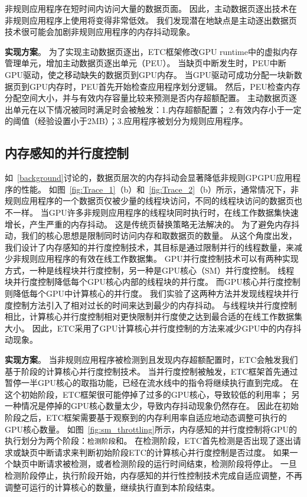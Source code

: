 非规则应用程序在短时间内访问大量的数据页面。
因此，主动数据页逐出技术在非规则应用程序上使用将变得非常低效。
我们发现潜在地缺点是主动逐出数据页技术很可能会加剧非规则应用程序的内存抖动现象。

\textbf{实现方案}。
为了实现主动数据页逐出，ETC框架修改GPU runtime中的虚拟内存管理单元，增加主动数据页逐出单元（PEU）。
当缺页中断发生时，PEU中断GPU驱动，使之移动缺失的数据页到GPU内存。
当GPU驱动可成功分配一块新数据页到GPU内存时，PEU首先开始检查应用程序划分逻辑。
然后，PEU检查内存分配空间大小，并与有效内存容量比较来预测是否内存超额配置。
主动数据页逐出单元在以下情况被同时满足时会被触发：1.内存超额配置； 2.有效内存小于一定的阈值（经验设置小于2MB）；3.应用程序被划分为规则应用程序。


\subsection{内存感知的并行度控制}

如~\ref{background}讨论的，数据页层次的内存抖动会显著降低非规则GPGPU应用程序的性能。
如图~\ref{fig:Trace_1}（b）和~\ref{fig:Trace_2}（b）所示，通常情况下，非规则应用程序的一个数据页仅被少量的线程块访问，不同的线程块访问的数据页也不一样。
当GPU许多非规则应用程序的线程块同时执行时，在线工作数据集快速增长，产生严重的内存抖动。
这是传统页替换策略无法解决的。
为了避免内存抖动，我们的核心思想是限制同时访问内存和取数据页的数量。
从这个角度出发，我们设计了内存感知的并行度控制技术，其目标是通过限制并行的线程数量，来减少非规则应用程序的有效在线工作数据集。
GPU并行度控制技术可以有两种实现方式，一种是线程块并行度控制，另一种是GPU核心（SM）并行度控制。
线程块并行度控制降低每个GPU核心内部的线程块的并行度。
而GPU核心并行度控制则降低每个GPU中计算核心的并行度。
我们实验了这两种方法并发现线程块并行度控制方法引入了相对过长的时间来达到最少的内存抖动。
与线程块并行度控制相比，计算核心并行度控制相对更快限制并行度使之达到最合适的在线工作数据集大小。
因此，ETC采用了GPU计算核心并行度控制的方法来减少GPU中的内存抖动现象。

\textbf{实现方案}。
当非规则应用程序被检测到且发现内存超额配置时，ETC会触发我们基于阶段的计算核心并行度控制技术。
当并行度控制被触发，ETC框架首先通过暂停一半GPU核心的取指功能，已经在流水线中的指令将继续执行直到完成。
在这个初始阶段，ETC框架很可能停掉了过多的GPU核心，导致较低的利用率；
另一种情况是停掉的GPU核心数量太少，导致内存抖动现象仍然存在。
因此在初始阶段之后，ETC框架需要基于观察到的内存利用率自适应地动态调整可执行的GPU核心数量。
如图~\ref{fig:sm_throttling}所示，内存感知的并行度控制将GPU的执行划分为两个阶段：\texttt{检测阶段}和。
在检测阶段，ETC首先检测是否出现了逐出请求或缺页中断请求来判断初始阶段ETC的计算核心并行度控制是否过度。
如果一个缺页中断请求被检测，或者检测阶段的运行时间结束，检测阶段将停止。
一旦检测阶段停止，执行阶段开始，内存感知的并行性控制技术完成自适应调整，不再调整可运行的计算核心的数量，继续执行直到本阶段结束。

